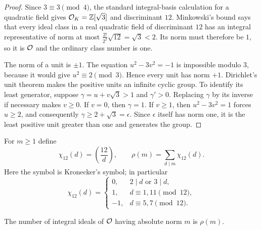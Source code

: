\begin{proof}
Since $3\equiv3\pmod4$, the standard integral-basis calculation for a
quadratic field gives $\mathcal O_K=\mathbb Z[\sqrt3]$ and discriminant $12$.
Minkowski's bound says that every ideal class in a real quadratic field of
discriminant $12$ has an integral representative of norm at most
\(\frac{2!}{2^2}\sqrt{12}=\sqrt3<2\).  Its norm must therefore be $1$,
so it is $\mathcal O$ and the ordinary class number is one.

The norm of a unit is $\pm1$.  The equation $u^2-3v^2=-1$ is impossible
modulo $3$, because it would give $u^2\equiv2\pmod3$.  Hence every unit
has norm $+1$.  Dirichlet's unit theorem makes the positive units an
infinite cyclic group.  To identify its least generator, suppose
$\gamma=u+v\sqrt3>1$ and $\gamma'>0$.  Replacing $\gamma$ by its inverse
if necessary makes $v\geq0$.  If $v=0$, then $\gamma=1$.  If $v\geq1$,
then $u^2-3v^2=1$ forces $u\geq2$, and consequently
$\gamma\geq2+\sqrt3=\epsilon$.  Since $\epsilon$ itself has norm one,
it is the least positive unit greater than one and generates the group.
\end{proof}

For $m\geq1$ define
\begin{equation}
 \chi_{12}(d)=\left(\frac{12}{d}\right),
 \qquad
 \rho(m)=\sum_{d\mid m}\chi_{12}(d).
 \label{koide-param-eq:rho-definition}
\end{equation}
Here the symbol is Kronecker's symbol; in particular
\begin{equation}
 \chi_{12}(d)=
 \begin{cases}
  0,&2\mid d\text{ or }3\mid d,\\
  1,&d\equiv1,11\pmod {12},\\
  -1,&d\equiv5,7\pmod {12}.
 \end{cases}
 \label{koide-param-eq:chi12-table}
\end{equation}

\begin{lemma}
\label{koide-param-lem:ideal-number}
The number of integral ideals of $\mathcal O$ having absolute norm $m$ is
$\rho(m)$.
\end{lemma}

